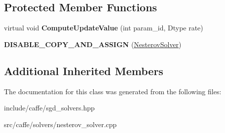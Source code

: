 \subsection*{Protected Member Functions}
\begin{DoxyCompactItemize}
\item 
virtual void {\bfseries Compute\+Update\+Value} (int param\+\_\+id, Dtype rate)\hypertarget{classcaffe_1_1NesterovSolver_ac626ccf5a7edfd8dbde70b2ee513c9e7}{}\label{classcaffe_1_1NesterovSolver_ac626ccf5a7edfd8dbde70b2ee513c9e7}

\item 
{\bfseries D\+I\+S\+A\+B\+L\+E\+\_\+\+C\+O\+P\+Y\+\_\+\+A\+N\+D\+\_\+\+A\+S\+S\+I\+GN} (\hyperlink{classcaffe_1_1NesterovSolver}{Nesterov\+Solver})\hypertarget{classcaffe_1_1NesterovSolver_a8ad4901ffc73049b2dc5bc7d3789b7dc}{}\label{classcaffe_1_1NesterovSolver_a8ad4901ffc73049b2dc5bc7d3789b7dc}

\end{DoxyCompactItemize}
\subsection*{Additional Inherited Members}


The documentation for this class was generated from the following files\+:\begin{DoxyCompactItemize}
\item 
include/caffe/sgd\+\_\+solvers.\+hpp\item 
src/caffe/solvers/nesterov\+\_\+solver.\+cpp\end{DoxyCompactItemize}
